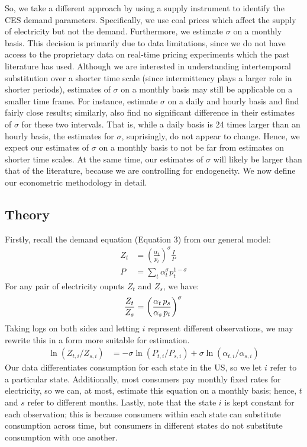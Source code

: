 \documentclass[11pt,a4paper]{extarticle}
\begin{document}
So, we take a different approach by using a supply instrument to identify the CES demand parameters. Specifically, we use coal prices which affect the supply of electricity but not the demand. Furthermore, we estimate $\sigma$ on a monthly basis. This decision is primarily due to data limitations, since we do  not have access to the proprietary data on real-time pricing experiments which the past literature has used. Although we are interested in understanding intertemporal substitution over a shorter time scale (since intermittency plays a larger role in shorter periods), estimates of $\sigma$ on a monthly basis may still be applicable on a smaller time frame. For instance, \citet{Schwarz} estimate $\sigma$ on a daily and hourly basis and find fairly close results; similarly, \citet{Herriges} also find no significant difference in their estimates of $\sigma$ for these two intervals. That is, while a daily basis is 24 times larger than an hourly basis, the estimates for $\sigma$, suprisingly, do not appear to change. Hence, we expect our estimates of $\sigma$ on a monthly basis to not be far from estimates on shorter time scales. At the same time, our estimates of $\sigma$ will likely be larger than that of the literature, because we are controlling for endogeneity. We now define our econometric methodology in detail.

\subsection{Theory}


Firstly, recall the demand equation (Equation 3) from our general model:
\begin{align*}
Z_t &= \left(\frac{\alpha_t}{p_t} \right)^\sigma \frac{I}{P} \\
P &= \sum_t \alpha_t^\sigma p_t^{1-\sigma}
\end{align*}
For any pair of electricity ouputs $Z_t$ and $Z_s$, we have:
$$\frac{Z_t}{Z_s} = \left(\frac{\alpha_t \, p_s}{\alpha_s \, p_t} \right)^\sigma \\$$
Taking logs on both sides and letting $i$ represent different observations, we may rewrite this in a form more suitable for estimation. 
\begin{align*}
\ln (Z_{t, i} / Z_{ s, i}) &= -\sigma \ln (P_{t,i} / P_{s,i}) + \sigma \ln (\alpha_{t,i} / \alpha_{s,i}) 
\end{align*}
Our data differentiates consumption for each state in the US, so we let $i$ refer to a particular state. Additionally, most consumers pay monthly fixed rates for electricity, so we can, at most, estimate this equation on a monthly basis; hence, $t$ and $s$ refer to different months. Lastly, note that the state $i$ is kept constant for each observation; this is because consumers within each state can substitute consumption across time, but consumers in different states do not substitute consumption with one another. 
\end{document}
